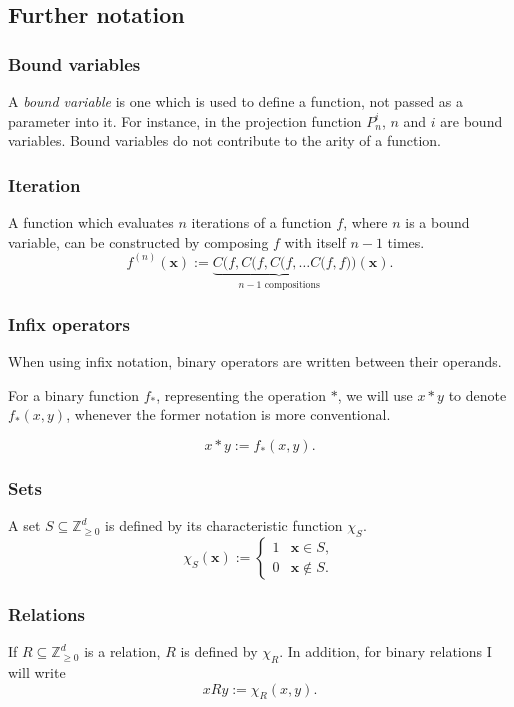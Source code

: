 \documentclass[a4paper]{article}
\newcommand{\ZZ}{\mathbb{Z}}
\newcommand{\xvec}{\mathbf{x}}	%
\theoremstyle{plain}
\theoremstyle{definition}
\begin{document}
\subsection{Further notation}

\subsubsection{Bound variables}
A \textit{bound variable} is one which is used to define a function, not passed as a parameter into it. For instance, in the projection function $P_n^i$, $n$ and $i$ are bound variables. Bound variables do not contribute to the arity of a function.

\subsubsection{Iteration}
A function which evaluates $n$ iterations of a function $f$, where $n$ is a bound variable, can be constructed by composing $f$ with itself $n-1$ times.
\[f^{(n)}(\xvec) := \underbrace{C(f,C(f,C(f, \dots C(f,f}_{n-1 \textrm{ compositions}}) )(\xvec).\]

\subsubsection{Infix operators}
When using infix notation, binary operators are written between their operands.

For a binary function $f_{\ast}$, representing the operation $\ast$, we will use $x \ast y$ to denote $f_{\ast}(x,y)$, whenever the former notation is more conventional.

\[x \ast y := f_{\ast}(x,y). \]

\subsubsection{Sets}
A set $S \subseteq \ZZ_{\geq 0}^d$ is defined by its characteristic function $\chi_S$.
\[\chi_S(\xvec) := \begin{cases}
 1 & \xvec \in S, \\
 0 & \xvec \notin S.
 \end{cases}
\]

\subsubsection{Relations}
If $R \subseteq \ZZ_{\geq 0}^d$ is a relation, $R$ is defined by $\chi_R$. In addition, for binary relations I will write
\[ x R y := \chi_R(x,y). \]
\end{document}
